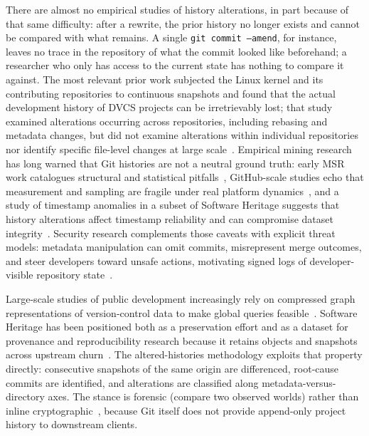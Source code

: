 There are almost no empirical studies of history alterations, in part because of that same difficulty: after a rewrite, the prior history no longer exists and cannot be compared with what remains.
A single \texttt{git commit --amend}, for instance, leaves no trace in the repository of what the commit looked like beforehand; a researcher who only has access to the current state has nothing to compare it against.
The most relevant prior work subjected the Linux kernel and its contributing repositories to continuous snapshots and found that the actual development history of DVCS projects can be irretrievably lost; that study examined alterations occurring across repositories, including rebasing and metadata changes, but did not examine alterations within individual repositories nor identify specific file-level changes at large scale~\cite{DBLP:journals/ese/GermanAH16}.
Empirical mining research has long warned that Git histories are not a neutral ground truth: early MSR work catalogues structural and statistical pitfalls~\cite{bird2009promisesmininggit}, GitHub-scale studies echo that measurement and sampling are fragile under real platform dynamics~\cite{kalliamvakou2014promises}, and a study of timestamp anomalies in a subset of Software Heritage suggests that history alterations affect timestamp reliability and can compromise dataset integrity~\cite{DBLP:journals/ese/FlintCD22}.
Security research complements those caveats with explicit threat models: metadata manipulation can omit commits, misrepresent merge outcomes, and steer developers toward unsafe actions, motivating signed logs of developer-visible repository state~\cite{torresarias2016gitmetadata}.

Large-scale studies of public development increasingly rely on compressed graph representations of version-control data to make global queries feasible~\cite{saner-2020-swh-graph,DBLP:conf/msr/PietriSZ20}.
Software Heritage has been positioned both as a preservation effort and as a dataset for provenance and reproducibility research because it retains objects and snapshots across upstream churn~\cite{swhcacm2018,cise-2020-doi}.
The altered-histories methodology exploits that property directly: consecutive snapshots of the same origin are differenced, root-cause commits are identified, and alterations are classified along metadata-versus-directory axes.
The stance is forensic (compare two observed worlds) rather than inline cryptographic~\cite{torresarias2016gitmetadata}, because Git itself does not provide append-only project history to downstream clients.

